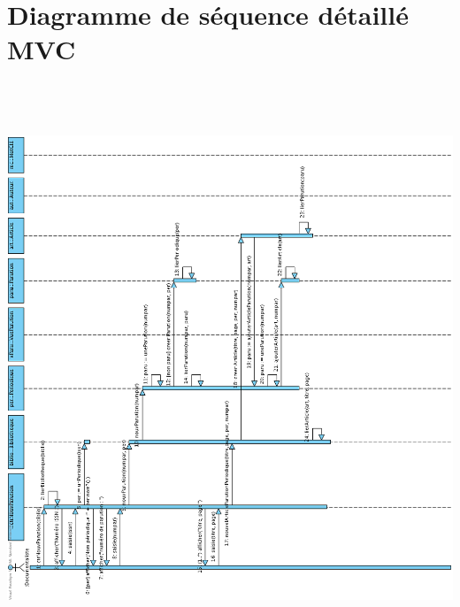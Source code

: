 \documentclass[a4paper,10pt]{report}
\begin{document}
\section*{Diagramme de séquence détaillé MVC}
\includegraphics[height=170mm]{NouvNumPerMVC.png}
\end{document}
